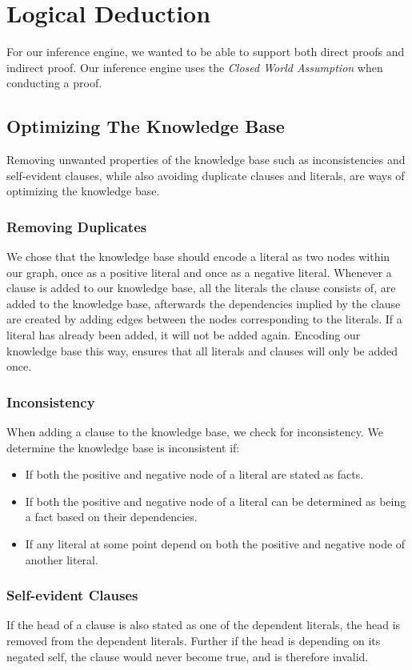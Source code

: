\documentclass[11pt]{article}
\begin{document}
\section{Logical Deduction}
For our inference engine, we wanted to be able to support both direct proofs and indirect proof. Our inference engine uses the \emph{Closed World Assumption} when conducting a proof.

\subsection{Optimizing The Knowledge Base}
Removing unwanted properties of the knowledge base such as inconsistencies and self-evident clauses, while also avoiding duplicate clauses and literals, are ways of optimizing the knowledge base.

\subsubsection{Removing Duplicates}
We chose that the knowledge base should encode a literal as two nodes within our graph, once as a positive literal and once as a negative literal. Whenever a clause is added to our knowledge base, all the literals the clause consists of, are added to the knowledge base, afterwards the dependencies implied by the clause are created by adding edges between the nodes corresponding to the literals. If a literal has already been added, it will not be added again. Encoding our knowledge base this way, ensures that all literals and clauses will only be added once.

\subsubsection{Inconsistency}
When adding a clause to the knowledge base, we check for inconsistency. We determine the knowledge base is inconsistent if:
\begin{itemize}
	\item If both the positive and negative node of a literal are stated as facts.
	\item If both the positive and negative node of a literal can be determined as being a fact based on their dependencies.
	\item If any literal at some point depend on both the positive and negative node of another literal.
\end{itemize}

\subsubsection{Self-evident Clauses}
If the head of a clause is also stated as one of the dependent literals, the head is removed from the dependent literals. Further if the head is depending on its negated self, the clause would never become true, and is therefore invalid.
\end{document}
